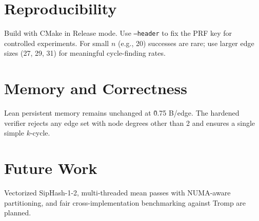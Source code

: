 \documentclass{article}
\begin{document}
\section{Reproducibility}
Build with CMake in Release mode. Use \texttt{--header} to fix the PRF key for controlled experiments. For small $n$ (e.g., 20) successes are rare; use larger edge sizes (27, 29, 31) for meaningful cycle-finding rates.

\section{Memory and Correctness}
Lean persistent memory remains unchanged at \~0.75 B/edge. The hardened verifier rejects any edge set with node degrees other than 2 and ensures a single simple $k$-cycle.

\section{Future Work}
Vectorized SipHash-1-2, multi-threaded mean passes with NUMA-aware partitioning, and fair cross-implementation benchmarking against Tromp are planned.
\end{document}
